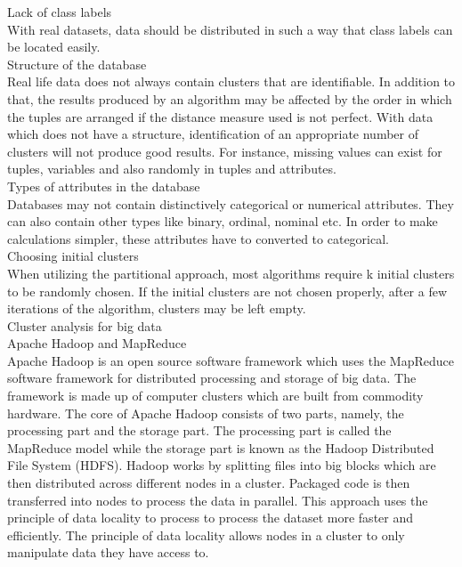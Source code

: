 \documentclass[conference]{IEEEtran}
\begin{document}
Lack of class labels \\

With real datasets, data should be distributed in such a way that class labels can be located easily.\\
 
Structure of the database\\

Real life data does not always contain clusters that are identifiable. In addition to that, the results produced by an algorithm may be affected by the order in which the tuples are arranged if the distance measure used is not perfect. With data which does not have a structure, identification of an appropriate number of clusters will not produce good results. For instance, missing values can exist for tuples, variables and also randomly in tuples and attributes.\\

Types of attributes in the database\\

Databases may not contain distinctively categorical or numerical attributes. They can also contain other types like binary, ordinal, nominal etc. In order to make calculations simpler, these attributes have to converted to categorical.\\

Choosing initial clusters \\

When utilizing the partitional approach, most algorithms require k initial clusters to be randomly chosen. If the initial clusters are not chosen properly, after a few iterations of the algorithm, clusters may be left empty.\\

Cluster analysis for big data\\

Apache Hadoop and MapReduce\\

Apache Hadoop is an open source software framework which uses the MapReduce software framework for distributed processing and storage of big data. The framework is made up of computer clusters which are built from commodity hardware. The core of Apache Hadoop consists of two parts, namely, the processing part and the storage part. The processing part is called the MapReduce model while the storage part is known as the Hadoop Distributed File System (HDFS). Hadoop works by splitting files into big blocks which are then distributed across different nodes in a cluster. Packaged code is then transferred into nodes to process the data in parallel. This approach uses the principle of data locality to process to process the dataset more faster and efficiently. The principle of data locality allows nodes in a cluster to only manipulate data they have access to. \\
\end{document}
